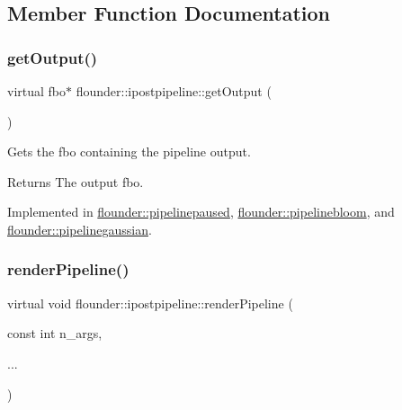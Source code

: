 \subsection{Member Function Documentation}
\mbox{\label{classflounder_1_1ipostpipeline_a08f5d19b9652528337b73c2f4e0e4258}} 
\subsubsection{\texorpdfstring{get\+Output()}{getOutput()}}
{\footnotesize\ttfamily virtual fbo$\ast$ flounder\+::ipostpipeline\+::get\+Output (\begin{DoxyParamCaption}{ }\end{DoxyParamCaption})\hspace{0.3cm}{\ttfamily [pure virtual]}}



Gets the fbo containing the pipeline output. 

\begin{DoxyReturn}{Returns}
The output fbo. 
\end{DoxyReturn}


Implemented in \hyperlink{classflounder_1_1pipelinepaused_a7824b6364878b5aaf57921e2a7a4915a}{flounder\+::pipelinepaused}, \hyperlink{classflounder_1_1pipelinebloom_a0ab1108f9115014014f7a8bd5ca5ac34}{flounder\+::pipelinebloom}, and \hyperlink{classflounder_1_1pipelinegaussian_aae27c8214a8a544b1ab96ddd2383a2b2}{flounder\+::pipelinegaussian}.

\mbox{\label{classflounder_1_1ipostpipeline_a975b354967fa358076d02380feb55265}} 
\subsubsection{\texorpdfstring{render\+Pipeline()}{renderPipeline()}}
{\footnotesize\ttfamily virtual void flounder\+::ipostpipeline\+::render\+Pipeline (\begin{DoxyParamCaption}\item[{const int}]{n\+\_\+args,  }\item[{}]{... }\end{DoxyParamCaption})\hspace{0.3cm}{\ttfamily [pure virtual]}}



